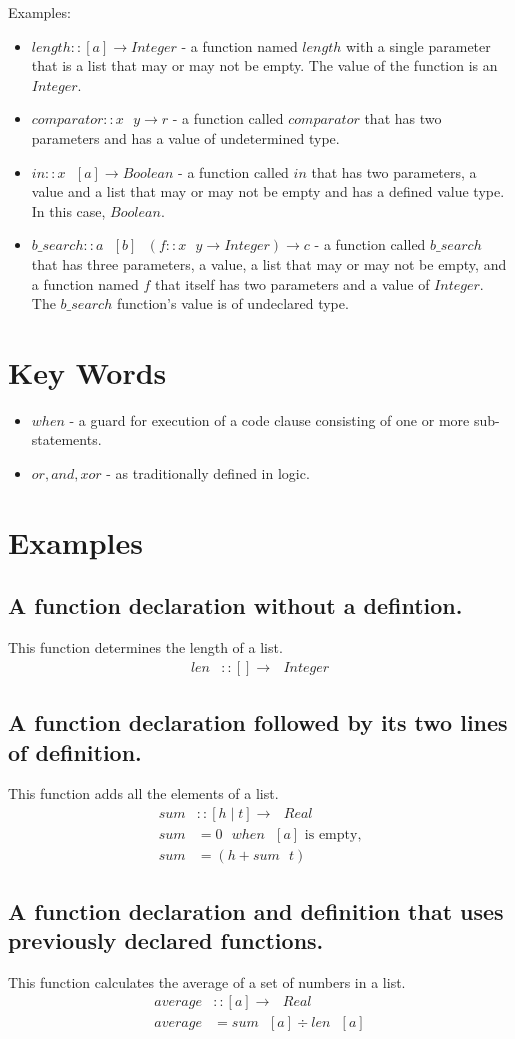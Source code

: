 \documentclass[12pt]{amsart}
\begin{document}
Examples:
\begin{itemize}
\item $length::[a]\rightarrow Integer$ - a function named $length$ with a single parameter that is a list that may or may not be empty. The value of the function is an $Integer$.
\item $comparator::x\text{ }y\rightarrow r$ - a function called $comparator$ that has two parameters and has a value of undetermined type.
\item $in::x\text{ }[a]\rightarrow Boolean$ - a function called $in$ that has two parameters, a value and a list that may or may not be empty and has a defined value type. In this case, $Boolean$.
\item $b\_search:: a\text{ }[b]\text{ }(f::x\text{ }y\rightarrow Integer)\rightarrow c$ -  a function called $b\_search$ that has three parameters, a value, a list that may or may not be empty, and a function named $f$ that itself has two parameters and a value of $Integer$. The $b\_search$ function's value is of undeclared type.
\end{itemize}

\section{Key Words}
\begin{itemize}
\item $when$ - a guard for execution of a code clause consisting of one or more sub-statements.
\item $or, and, xor$ - as traditionally defined in logic.
\end{itemize}

\section{Examples}

\subsection{A function declaration without a defintion.}
This function determines the length of a list. 
\begin{align*}
len&::[]\rightarrow \text{ }Integer
\end{align*}

\subsection{A function declaration followed by its two lines of definition.}
This function adds all the elements of a list.
\begin{align*}
sum&::[h\mid t]\rightarrow \text{ }Real\\
sum&= 0 \text{ }when\text{ }[a]\text{ is empty,}\\
sum&= (h+sum\text{ }t)
\end{align*}

\subsection{A function declaration and definition that uses previously declared functions.}
This function calculates the average of a set of numbers in a list.
\begin{align*}
average&::[a]\rightarrow \text{ }Real\\
average&= sum\text{ }[a]\div len\text{ }[a]
\end{align*}
\end{document}
